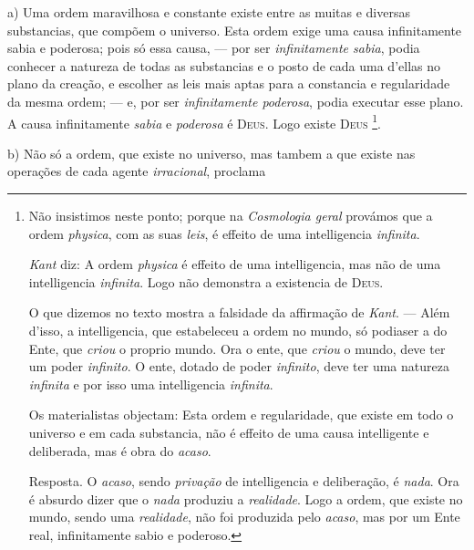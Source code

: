 a) Uma ordem maravilhosa e constante existe entre as muitas e diversas substancias, que compõem o universo. Esta ordem exige uma causa infinitamente sabia e poderosa; pois só essa causa, --- por ser \emph{infinitamente sabia}, podia conhecer a natureza de todas as substancias e o posto de cada uma d'ellas no plano da creação, e escolher as leis mais aptas para a constancia e regularidade da mesma ordem; --- e, por ser \emph{infinitamente poderosa}, podia executar esse plano. A causa infinitamente \emph{sabia} e \emph{poderosa} é \textsc{Deus}. Logo existe \textsc{Deus} \footnote{Não insistimos neste ponto; porque na \emph{Cosmologia geral} provámos que a ordem \emph{physica}, com as suas \emph{leis}, é effeito de uma intelligencia \emph{infinita}.\par \emph{Kant} diz: A ordem \emph{physica} é effeito de uma intelligencia, mas não de uma intelligencia \emph{infinita}. Logo não demonstra a existencia de \textsc{Deus}.\par O que dizemos no texto mostra a falsidade da affirmação de \emph{Kant}. --- Além d'isso, a intelligencia, que estabeleceu a ordem no mundo, só podiaser a do Ente, que \emph{criou} o proprio mundo. Ora o ente, que \emph{criou} o mundo, deve ter um poder \emph{infinito}. O ente, dotado de poder \emph{infinito}, deve ter uma natureza \emph{infinita} e por isso uma intelligencia \emph{infinita}.\par Os materialistas objectam: Esta ordem e regularidade, que existe em todo o universo e em cada substancia, não é effeito de uma causa intelligente e deliberada, mas é obra do \emph{acaso}.\par Resposta. O \emph{acaso}, sendo \emph{privação} de intelligencia e deliberação, é \emph{nada}. Ora é absurdo dizer que o \emph{nada} produziu a \emph{realidade}. Logo a ordem, que existe no mundo, sendo uma \emph{realidade}, não foi produzida pelo \emph{acaso}, mas por um Ente real, infinitamente sabio e poderoso.}.

b) Não só a ordem, que existe no universo, mas tambem a que existe nas operações de cada agente \emph{irracional}, proclama